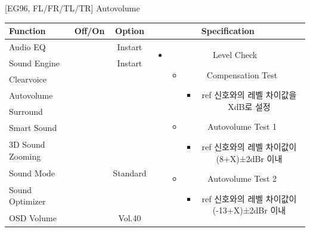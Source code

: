 \documentclass{beamer}
\begin{document}
\begin{frame}[t]{[EG96, FL/FR/TL/TR] Autovolume}
\begin{tiny}
\begin{tabular}{@{}lccc@{}}
\toprule
Function & Off/On & Option & Specification \\
\midrule
Audio EQ & \color{black}{Off} & Instart &
\multirow{10}{60mm}{
\begin{itemize}
\item Level Check
	\begin{itemize}
	\item Compensation Test
		\begin{itemize}\tiny
		\item ref 신호와의 레벨 차이값을 XdB로 설정
		\end{itemize}
	\item Autovolume Test 1
		\begin{itemize}\tiny
		\item ref 신호와의 레벨 차이값이 (8+X)±2dBr 이내
		\end{itemize}
	\item Autovolume Test 2
		\begin{itemize}\tiny
		\item ref 신호와의 레벨 차이값이 (-13+X)±2dBr 이내
		\end{itemize}
	\end{itemize}
\end{itemize}
} \\
Sound Engine & \color{blue}{On} & Instart & \\
Clearvoice & \color{black}{Off} & & \\
Autovolume & \color{blue}{On} & & \\
Surround & \color{black}{Off} & & \\
Smart Sound & \color{black}{Off} & & \\
3D Sound Zooming & \color{black}{Off} & & \\
Sound Mode & \color{blue}{On} & Standard & \\
Sound Optimizer & \color{black}{Off} & & \\
OSD Volume & \color{blue}{On} & Vol.40 & \\
\midrule
\end{tabular}
\end{tiny}

\end{frame}
\end{document}
